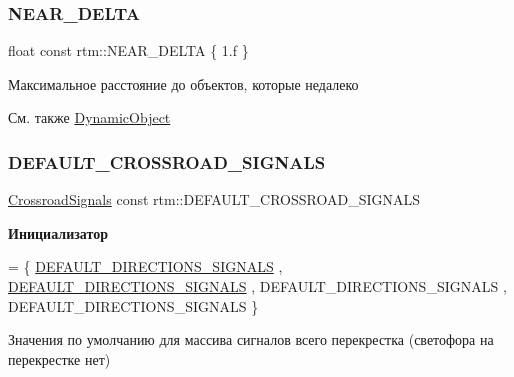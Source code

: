 \subsubsection{\texorpdfstring{N\+E\+A\+R\+\_\+\+D\+E\+L\+TA}{NEAR\_DELTA}}
{\footnotesize\ttfamily float const rtm\+::\+N\+E\+A\+R\+\_\+\+D\+E\+L\+TA \{ 1.f \}}

Максимальное расстояние до объектов, которые недалеко \begin{DoxySeeAlso}{См. также}
\hyperlink{classrtm_1_1_dynamic_object}{Dynamic\+Object} 
\end{DoxySeeAlso}
\mbox{\label{namespacertm_ac3892e23135322d9026ef00af1a76344}} 
\subsubsection{\texorpdfstring{D\+E\+F\+A\+U\+L\+T\+\_\+\+C\+R\+O\+S\+S\+R\+O\+A\+D\+\_\+\+S\+I\+G\+N\+A\+LS}{DEFAULT\_CROSSROAD\_SIGNALS}}
{\footnotesize\ttfamily \hyperlink{namespacertm_afa6df86cef8e2ebcc053ad994e440354}{Crossroad\+Signals} const rtm\+::\+D\+E\+F\+A\+U\+L\+T\+\_\+\+C\+R\+O\+S\+S\+R\+O\+A\+D\+\_\+\+S\+I\+G\+N\+A\+LS}

{\bfseries Инициализатор}
\begin{DoxyCode}
= \{
        \hyperlink{namespacertm_ab5bb2d119539a5a60349a21fec8821f6}{DEFAULT\_DIRECTIONS\_SIGNALS}
        , \hyperlink{namespacertm_ab5bb2d119539a5a60349a21fec8821f6}{DEFAULT\_DIRECTIONS\_SIGNALS}
        , DEFAULT\_DIRECTIONS\_SIGNALS
        , DEFAULT\_DIRECTIONS\_SIGNALS
    \}
\end{DoxyCode}


Значения по умолчанию для массива сигналов всего перекрестка (светофора на перекрестке нет) 

\mbox{\label{namespacertm_a88c10d12831a4c6e13e0babdf7c27b02}} 
